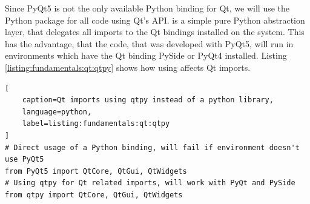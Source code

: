 Since PyQt5 is not the only available Python binding for Qt, we will use the
Python package  for all code using Qt's API.
 is a simple pure Python abstraction layer, that
delegates all imports to the Qt bindings installed on the system. This has the
advantage, that the code, that was developed with PyQt5, will run in
environments which have the Qt binding PySide or PyQt4 installed. Listing
\ref{listing:fundamentals:qt:qtpy} shows how using 
affects Qt imports.

\begin{lstlisting}[
    caption=Qt imports using qtpy instead of a python library,
    language=python, 
    label=listing:fundamentals:qt:qtpy
]
# Direct usage of a Python binding, will fail if environment doesn't use PyQt5
from PyQt5 import QtCore, QtGui, QtWidgets
# Using qtpy for Qt related imports, will work with PyQt and PySide
from qtpy import QtCore, QtGui, QtWidgets
\end{lstlisting}

